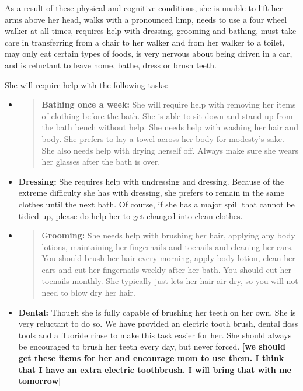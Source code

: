 \documentclass[]{article}
\begin{document}
As a result of these physical and cognitive conditions, she is unable to
lift her arms above her head, walks with a pronounced limp, needs to use
a four wheel walker at all times, requires help with dressing, grooming
and bathing, must take care in transferring from a chair to her walker
and from her walker to a toilet, may only eat certain types of foods, is
very nervous about being driven in a car, and is reluctant to leave
home, bathe, dress or brush teeth.

She will require help with the following tasks:

\begin{itemize}
\item
  \begin{quote}
  \textbf{Bathing once a week:} She will require help with removing her
  items of clothing before the bath. She is able to sit down and stand
  up from the bath bench without help. She needs help with washing her
  hair and body. She prefers to lay a towel across her body for
  modesty's sake. She also needs help with drying herself off. Always
  make sure she wears her glasses after the bath is over.
  \end{quote}
\end{itemize}

\begin{itemize}
\item
  \textbf{Dressing:} She requires help with undressing and dressing.
  Because of the extreme difficulty she has with dressing, she prefers
  to remain in the same clothes until the next bath. Of course, if she
  has a major spill that cannot be tidied up, please do help her to get
  changed into clean clothes.
\end{itemize}

\begin{itemize}
\item
  \begin{quote}
  G\textbf{rooming:} She needs help with brushing her hair, applying any
  body lotions, maintaining her fingernails and toenails and cleaning
  her ears. You should brush her hair every morning, apply body lotion,
  clean her ears and cut her fingernails weekly after her bath. You
  should cut her toenails monthly. She typically just lets her hair air
  dry, so you will not need to blow dry her hair.
  \end{quote}
\end{itemize}

\begin{itemize}
\item
  \textbf{Dental:} Though she is fully capable of brushing her teeth on
  her own. She is very reluctant to do so. We have provided an electric
  tooth brush, dental floss tools and a fluoride rinse to make this task
  easier for her. She should always be encouraged to brush her teeth
  every day, but never forced. \textbf{{[}we should get these items for
  her and encourage mom to use them. I think that I have an extra
  electric toothbrush. I will bring that with me tomorrow{]}}
\end{itemize}
\end{document}
